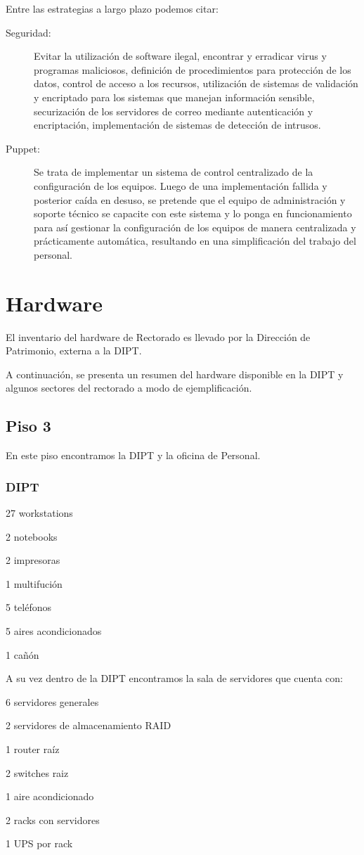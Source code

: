 \documentclass[a4paper,11pt,oneside]{article}
\begin{document}
Entre las estrategias a largo plazo podemos citar:
%
\begin{description}
\item[Seguridad:]
  Evitar la utilización de software ilegal, encontrar y
  erradicar virus y programas maliciosos, definición de procedimientos
  para protección de los datos, control de acceso a los recursos,
  utilización de sistemas de validación y encriptado para los
  sistemas que manejan información sensible, securización de los
  servidores de correo mediante autenticación y encriptación,
  implementación de sistemas de detección de intrusos.
%
\item[Puppet:]
  Se trata de implementar un sistema de control centralizado de la
  configuración de los equipos. Luego de una implementación fallida y
  posterior caída en desuso, se pretende que el equipo de
  administración y soporte técnico se capacite con este sistema y lo
  ponga en funcionamiento para así gestionar la configuración de los
  equipos de manera centralizada y prácticamente automática,
  resultando en una simplificación del trabajo del personal.
\end{description}
%
\section{Hardware}
%
El inventario del hardware de Rectorado es llevado por la
Dirección de Patrimonio, externa a la DIPT.

A continuación, se presenta un resumen del hardware disponible en la
DIPT y algunos sectores del rectorado a modo de ejemplificación.
%
\subsection*{Piso 3}
%
En este piso encontramos la DIPT y la oficina de Personal.
%
\newpage
\subsubsection*{DIPT}
%
\begin{itemize*}
\item 27 workstations
\item 2 notebooks
\item 2 impresoras
\item 1 multifución
\item 5 teléfonos
\item 5 aires acondicionados
\item 1 cañón
\end{itemize*}
%
A su vez dentro de la DIPT encontramos la sala de servidores que cuenta con:
\begin{itemize*}
\item 6 servidores generales
\item 2 servidores de almacenamiento RAID
\item 1 router raíz
\item 2 switches raiz
\item 1 aire acondicionado
\item 2 racks con servidores
\item 1 UPS por rack
\end{itemize*}
%
\end{document}
